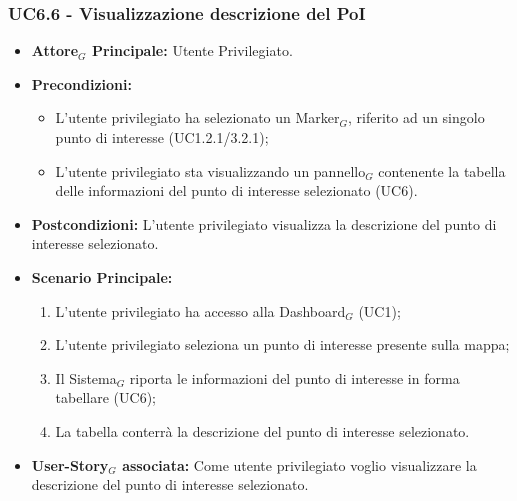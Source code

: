 \documentclass[10pt]{article}
\begin{document}
\begin{justify}
 \subsubsection{\textbf{UC6.6 - Visualizzazione descrizione del PoI}}
 \begin{itemize}
     \item \textbf{Attore$_G$ Principale:} Utente Privilegiato.
     \item \textbf{Precondizioni:}
       \begin{itemize}
    	        \item L'utente privilegiato ha selezionato un Marker$_G$, riferito ad un singolo punto di interesse (UC1.2.1/3.2.1);
          \item L'utente privilegiato sta visualizzando un pannello$_G$ contenente la tabella delle informazioni del punto di interesse selezionato (UC6).
       \end{itemize}
     \item \textbf{Postcondizioni:} L'utente privilegiato visualizza la descrizione del punto di interesse selezionato.
     \item \textbf{Scenario Principale:}
        \begin{enumerate}
            \item L'utente privilegiato ha accesso alla Dashboard$_G$ (UC1);
            \item L'utente privilegiato seleziona un punto di interesse presente sulla mappa;
            \item Il Sistema$_G$ riporta le informazioni del punto di interesse in forma tabellare (UC6);
            \item La tabella conterrà la descrizione del punto di interesse selezionato.
        \end{enumerate}
     \item \textbf{User-Story$_G$ associata:} Come utente privilegiato voglio visualizzare la descrizione del punto di interesse selezionato. 
 \end{itemize}



\end{justify}
\end{document}

